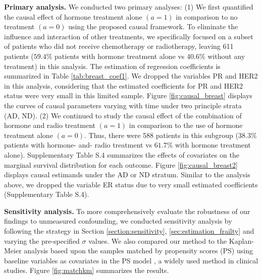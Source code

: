 \documentclass[APA,Times1COL]{WileyNJDv5} %
\theoremstyle{plain}
\begin{document}
\textbf{Primary analysis.} We conducted two primary analyses: (1) We first quantified the causal effect of hormone treatment alone $(a=1)$ in comparison to no treatment $(a=0)$ using the proposed causal framework. To eliminate the influence and interaction of other treatments, we specifically focused on a subset of patients who did not receive chemotherapy or radiotherapy, leaving 611 patients ($59.4\%$ patients with hormone treatment alone vs $40.6\%$ without any treatment) in this analysis. 
The estimation of regression coefficients is summarized in Table \ref{tab:breast_coef1}. We dropped the variables PR and HER2 in this analysis, considering that the estimated coefficients for PR and HER2 status were very small in this limited sample.
Figure \ref{fig:causal_breast} displays the curves of causal parameters varying with time under two principle strata (AD, ND). %
(2) We continued to study the causal effect of the combination of hormone and radio treatment $(a=1)$ in comparison to the use of hormone treatment alone $(a=0)$. Thus, there were 588 patients in this subgroup ($38.3\%$ patients with hormone- and- radio treatment vs $61.7\%$ with hormone treatment alone).  Supplementary Table S.4 summarizes the effects of covariates on the marginal survival distribution for each outcome. Figure \ref{fig:causal_breast2} displays causal estimands under the AD or ND stratum. Similar to the analysis above, we dropped the variable ER status due to very small estimated coefficients (Supplementary Table S.4). 

\textbf{Sensitivity analysis.} To more comprehensively evaluate the robustness of our findings to unmeasured confounding, we conducted sensitivity analysis by following the strategy in Section \ref{section:sensitivity}, \ref{sec:estimation_frailty} and varying the pre-specified $\sigma$ values. We also compared our method to the Kaplan-Meier analysis based upon the samples matched by propensity scores (PS) using baseline variables as covariates in the PS model \citep{austin2014use}, a widely used method in clinical studies. Figure \ref{fig:matchkm} summarizes the results. 
\end{document}
